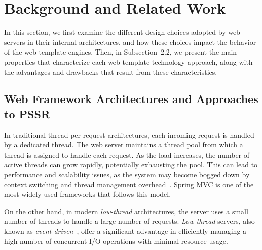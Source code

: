 \section{Background and Related Work}

In this section, we first examine the different design choices adopted by web 
servers in their internal architectures, and how these choices impact the 
behavior of the web template engines.
Then, in Subsection~2.2, we present the main properties that characterize each 
web template technology approach, along with the advantages and drawbacks that 
result from these characteristics.


\subsection{Web Framework Architectures and Approaches to PSSR}

In traditional thread-per-request architectures, each incoming request is
handled by a dedicated thread. The web server maintains a thread pool from
which a thread is assigned to handle each request. As the load increases, the
number of active threads can grow rapidly, potentially exhausting the pool.
This can lead to performance and scalability issues, as the system may become
bogged down by context switching and thread management
overhead~\cite{kant2000scalable}. Spring MVC is one of the most widely used
frameworks that follows this model.

On the other hand, in modern \textit{low-thread} architectures, the server uses
a small number of threads to handle a large number of requests.
\textit{Low-thread} servers, also known as
\textit{event-driven}~\cite{event-driven-servers}, offer a significant
advantage in efficiently managing a high number of concurrent I/O operations
with minimal resource usage.


